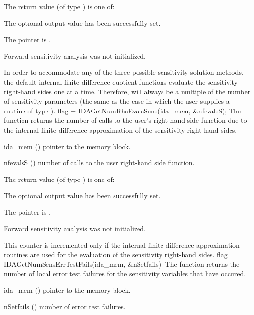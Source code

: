 {
  The return value  (of type ) is one of:
  \begin{args}
  \item[\Id{IDA\_SUCCESS}] 
    The optional output value has been successfully set.
  \item[\Id{IDA\_MEM\_NULL}]
    The  pointer is .
  \item[\Id{IDA\_NO\_SENS}]
    Forward sensitivity analysis was not initialized.
  \end{args}
}
{
  In order to accommodate any of the three possible sensitivity solution methods,
  the default internal 
  finite difference quotient functions evaluate the sensitivity right-hand sides 
  one at a time. Therefore,  will always be a multiple of the
  number of sensitivity parameters (the same as the case in which the user supplies
  a routine of type ).
}
{
  flag = IDAGetNumRhsEvalsSens(ida\_mem, \&nfevalsS);
}
{
  The function  returns the number of calls to the
  user's right-hand side function due to the internal finite difference approximation
  of the sensitivity right-hand sides.
}
{
  \begin{args}
  \item[ida\_mem] ()
    pointer to the {\idas} memory block.
  \item[nfevalsS] ()
    number of calls to the user right-hand side function.
  \end{args}
}
{
  The return value  (of type ) is one of:
  \begin{args}
  \item[\Id{IDA\_SUCCESS}] 
    The optional output value has been successfully set.
  \item[\Id{IDA\_MEM\_NULL}]
    The  pointer is .
  \item[\Id{IDA\_NO\_SENS}]
    Forward sensitivity analysis was not initialized.
  \end{args}
}
{
  This counter is incremented only if the internal finite difference approximation
  routines are used for the evaluation of the sensitivity right-hand sides.
}
{
  flag = IDAGetNumSensErrTestFails(ida\_mem, \&nSetfails);
}
{
  The function  returns the number of local
  error test failures for the sensitivity variables that have occured.
}
{
  \begin{args}
  \item[ida\_mem] ()
    pointer to the {\idas} memory block.
  \item[nSetfails] ()
    number of error test failures.
  \end{args}
}
